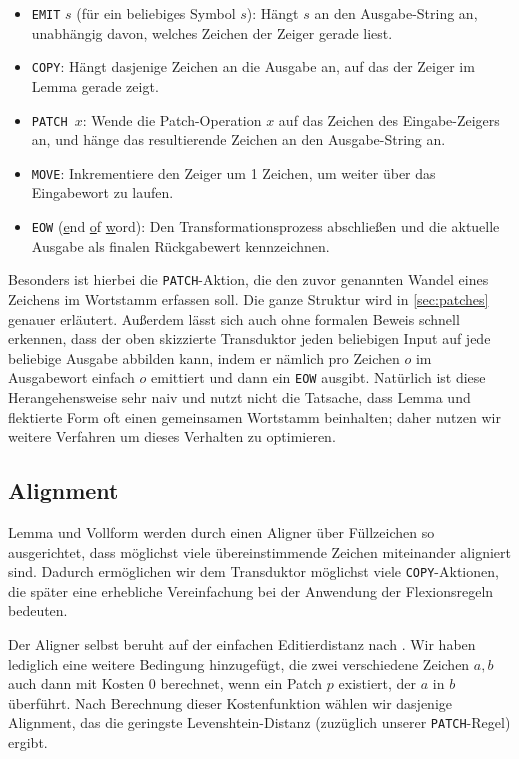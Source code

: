 \documentclass[a4paper]{article}
\newcommand{\action}[1]{\texttt{#1}}
\begin{document}
\begin{itemize}
    \item \action{EMIT} $s$ (für ein beliebiges Symbol $s$): Hängt $s$ an den Ausgabe-String an, unabhängig davon, welches Zeichen der Zeiger gerade liest.
    \item \action{COPY}: Hängt dasjenige Zeichen an die Ausgabe an, auf das der Zeiger im Lemma gerade zeigt.
    \item \action{PATCH $x$}: Wende die Patch-Operation $x$ auf das Zeichen des Eingabe-Zeigers an, und hänge das resultierende Zeichen an den Ausgabe-String an.
    \item \action{MOVE}: Inkrementiere den Zeiger um 1 Zeichen, um weiter über das Eingabewort zu laufen.
    \item \action{EOW} (\underline{e}nd \underline{o}f \underline{w}ord): Den Transformationsprozess abschließen und die aktuelle Ausgabe als finalen Rückgabewert kennzeichnen.
\end{itemize}

Besonders ist hierbei die \action{PATCH}-Aktion, die den zuvor genannten Wandel eines Zeichens im Wortstamm erfassen soll. Die ganze Struktur wird in \autoref{sec:patches} genauer erläutert.
Außerdem lässt sich auch ohne formalen Beweis schnell erkennen, dass der oben skizzierte Transduktor jeden beliebigen Input auf jede beliebige Ausgabe abbilden kann, indem er nämlich pro Zeichen $o$ im Ausgabewort einfach $o$ emittiert und dann ein \action{EOW} ausgibt. Natürlich ist diese Herangehensweise sehr naiv und nutzt nicht die Tatsache, dass Lemma und flektierte Form oft einen gemeinsamen Wortstamm beinhalten; daher nutzen wir weitere Verfahren um dieses Verhalten zu optimieren.

\subsection{Alignment}
\label{sec:alignment}
Lemma und Vollform werden durch einen Aligner über Füllzeichen so ausgerichtet, dass möglichst viele übereinstimmende Zeichen miteinander aligniert  sind. Dadurch ermöglichen wir dem Transduktor möglichst viele \action{COPY}-Aktionen, die später eine erhebliche Vereinfachung bei der Anwendung der Flexionsregeln bedeuten.

Der Aligner selbst beruht auf der einfachen Editierdistanz nach \citet{levenshtein:binary66}. Wir haben lediglich eine weitere Bedingung hinzugefügt, die zwei verschiedene Zeichen $a, b$ auch dann mit Kosten $0$ berechnet, wenn ein Patch $p$ existiert, der $a$ in $b$ überführt. Nach Berechnung dieser Kostenfunktion wählen wir dasjenige Alignment, das die geringste Levenshtein-Distanz (zuzüglich unserer \action{PATCH}-Regel) ergibt.
\end{document}
